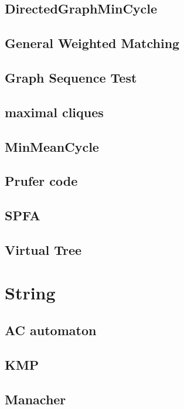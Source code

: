 \subsection{DirectedGraphMinCycle}

\subsection{General Weighted Matching}

\subsection{Graph Sequence Test}

\subsection{maximal cliques}

\subsection{MinMeanCycle}

\subsection{Prufer code}

\subsection{SPFA}

\subsection{Virtual Tree}


\section{String}
\subsection{AC automaton}

\subsection{KMP}

\subsection{Manacher}

